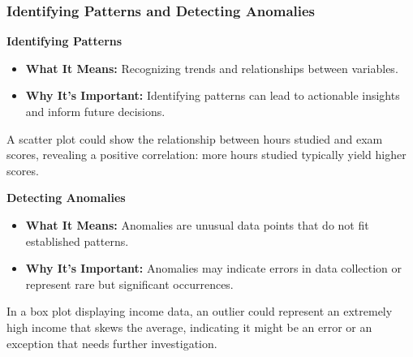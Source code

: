 \documentclass[aspectratio=169]{beamer}
\begin{document}
\begin{frame}[fragile]
    \frametitle{Identifying Patterns and Detecting Anomalies}

    \textbf{Identifying Patterns}

    \begin{itemize}
        \item \textbf{What It Means:} Recognizing trends and relationships between variables.
        \item \textbf{Why It's Important:} Identifying patterns can lead to actionable insights and inform future decisions.
    \end{itemize}
    
    \begin{example}
        A scatter plot could show the relationship between hours studied and exam scores, revealing a positive correlation: more hours studied typically yield higher scores.
    \end{example}

    \textbf{Detecting Anomalies}

    \begin{itemize}
        \item \textbf{What It Means:} Anomalies are unusual data points that do not fit established patterns.
        \item \textbf{Why It's Important:} Anomalies may indicate errors in data collection or represent rare but significant occurrences.
    \end{itemize}

    \begin{example}
        In a box plot displaying income data, an outlier could represent an extremely high income that skews the average, indicating it might be an error or an exception that needs further investigation.
    \end{example}
\end{frame}
\end{document}
